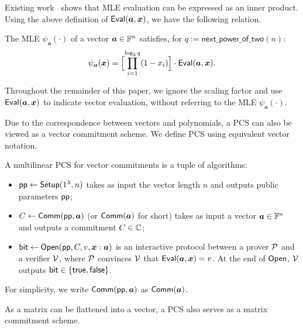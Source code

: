 Existing work~\cite{tcc/Lee21,asiacrypt/BuenzMMTV21,tcc/BootleCG20,eurocrypt/ChiesaHMVW20,crypto/Setty20}
shows that MLE evaluation can be expressed as an inner product.
Using the above definition of ${\sf Eval}(\bm{a}, \bm{x})$,
we have the following relation.

\begin{lemma}
\label{lemma:mleProjection}
	The MLE $\psi_{\bm{a}}(\cdot)$ of a vector $\bm{a} \in {\mathbb{F}}^{n}$ satisfies,
    for $q:=\mathsf{next\_power\_of\_two}(n)$:
	\begin{equation}
	\label{eq:mleprojection}
    \psi_{\bm{a}}(\bm{x})
    =
    \Bigl[\prod_{i=1}^{\log_2 q}(1-x_i)\Bigr]
    \cdot {\sf Eval}(\bm{a}, \bm{x}).
	\end{equation}
\end{lemma}

Throughout the remainder of this paper, we ignore the scaling factor and
use ${\sf Eval}(\bm{a}, \bm{x})$ to indicate vector evaluation, without referring to the MLE $\psi_{\bm{a}}(\cdot)$.

Due to the correspondence between vectors and polynomials,
a PCS can also be viewed as a vector commitment scheme.
We define PCS using equivalent vector notation.

\begin{definition}
\label{def:pcs}
	A multilinear PCS for vector commitments
	is a tuple of algorithms:
	\begin{itemize}[leftmargin=*, labelsep = 0.5em]
	\item ${\sf pp} \leftarrow {\sf Setup}(1^\lambda, n)$
	takes as input the vector length $n$
	and outputs public parameters ${\sf pp}$;
	\item $C \leftarrow {\sf Comm}({\sf pp}, \bm{a})$
	(or ${\sf Comm}(\bm{a})$ for short)
	takes as input a vector $\bm{a} \in {\mathbb{F}}^{n}$
	and outputs a commitment $C \in \mathbb{C}$;
	\item $\mathsf{bit} \leftarrow {\sf Open}({\sf pp}, C, v, \bm{x} : \bm{a})$
	is an interactive protocol between a prover $\mathcal{P}$
	and a verifier $\mathcal{V}$,
	where $\mathcal{P}$ convinces $\mathcal{V}$
	that ${\sf Eval}(\bm{a},\bm{x}) = v$.
    At the end of ${\sf Open}$, $\mathcal{V}$ outputs $\mathsf{bit} \in \{ {\sf true}, {\sf false} \}$.
	\end{itemize}
\end{definition}

For simplicity, we write ${\sf Comm}({\sf pp}, \bm{a})$ as ${\sf Comm}(\bm{a})$.

As a matrix can be flattened into a vector,
a PCS also serves as a matrix commitment scheme.


